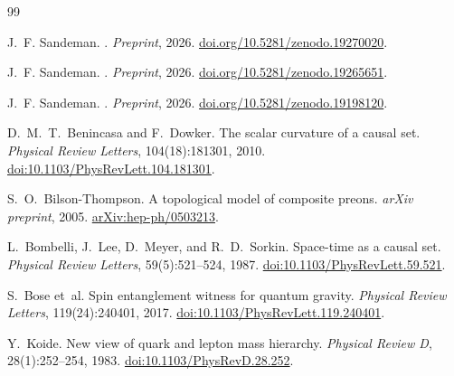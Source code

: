 \documentclass[11pt,a4paper]{article}
\begin{document}
\begin{thebibliography}{99}

J.~F. Sandeman.
.
\newblock \textit{Preprint}, 2026.
\newblock \href{https://doi.org/10.5281/zenodo.19270020}{doi.org/10.5281/zenodo.19270020}.


J.~F. Sandeman.
.
\newblock \textit{Preprint}, 2026.
\newblock \href{https://doi.org/10.5281/zenodo.19265651}{doi.org/10.5281/zenodo.19265651}.

J.~F. Sandeman.
.
\newblock \textit{Preprint}, 2026.
\newblock \href{https://doi.org/10.5281/zenodo.19198120}{doi.org/10.5281/zenodo.19198120}.


D.~M.~T.~Benincasa and F.~Dowker.
\newblock The scalar curvature of a causal set.
\newblock \emph{Physical Review Letters}, 104(18):181301, 2010.
\newblock \href{https://doi.org/10.1103/PhysRevLett.104.181301}%
  {doi:10.1103/PhysRevLett.104.181301}.

S.~O.~Bilson-Thompson.
\newblock A topological model of composite preons.
\newblock \emph{arXiv preprint}, 2005.
\newblock \href{https://arxiv.org/abs/hep-ph/0503213}{arXiv:hep-ph/0503213}.

L.~Bombelli, J.~Lee, D.~Meyer, and R.~D.~Sorkin.
\newblock Space-time as a causal set.
\newblock \emph{Physical Review Letters}, 59(5):521--524, 1987.
\newblock \href{https://doi.org/10.1103/PhysRevLett.59.521}%
  {doi:10.1103/PhysRevLett.59.521}.

S.~Bose et~al.
\newblock Spin entanglement witness for quantum gravity.
\newblock \emph{Physical Review Letters}, 119(24):240401, 2017.
\newblock \href{https://doi.org/10.1103/PhysRevLett.119.240401}%
  {doi:10.1103/PhysRevLett.119.240401}.

Y.~Koide.
\newblock New view of quark and lepton mass hierarchy.
\newblock \emph{Physical Review D}, 28(1):252--254, 1983.
\newblock \href{https://doi.org/10.1103/PhysRevD.28.252}%
  {doi:10.1103/PhysRevD.28.252}.


\end{thebibliography}
\end{document}
